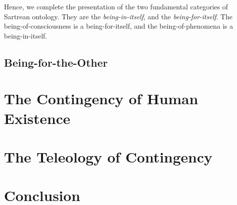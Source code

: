 Hence, we complete the presentation of the two fundamental categories of Sartrean ontology. They are the \emph{being-in-itself}, and the \emph{being-for-itself}. The being-of-consciousness is a being-for-itself, and the being-of-phenomena is a being-in-itself.



\section{Being-for-the-Other}



\chapter{The Contingency of Human Existence}

% 

\chapter{The Teleology of Contingency}


\chapter{Conclusion}

